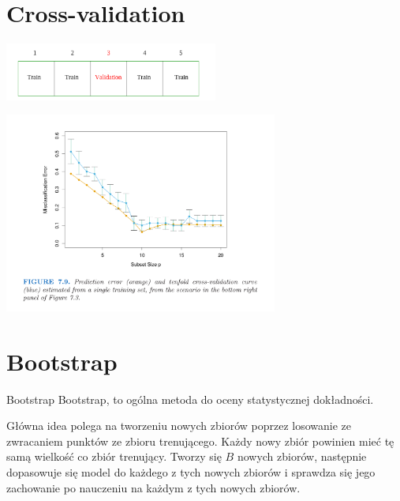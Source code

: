 \documentclass[a4paper]{beamer}
\begin{document}
\section{Cross-validation}
\begin{frame}
\begin{center}
\includegraphics[width=7cm]{corsscalidTibshi.png}
\end{center}
\pause
\begin{center}
\includegraphics[width=9cm]{fig7-9.png}
\end{center}
\end{frame}

\section{Bootstrap}
\begin{frame}
\begin{block}{Bootstrap}
Bootstrap, to ogólna metoda do oceny statystycznej dokładności.
\end{block}
\begin{block}{}
Główna idea polega na tworzeniu nowych zbiorów poprzez losowanie ze zwracaniem punktów ze zbioru trenującego. Każdy nowy zbiór powinien mieć tę samą wielkość co zbiór trenujący. Tworzy się $B$ nowych zbiorów, następnie dopasowuje się model do każdego z tych nowych zbiorów i sprawdza się jego zachowanie po nauczeniu na każdym z tych nowych zbiorów.
\end{block}
\end{frame}
\end{document}
